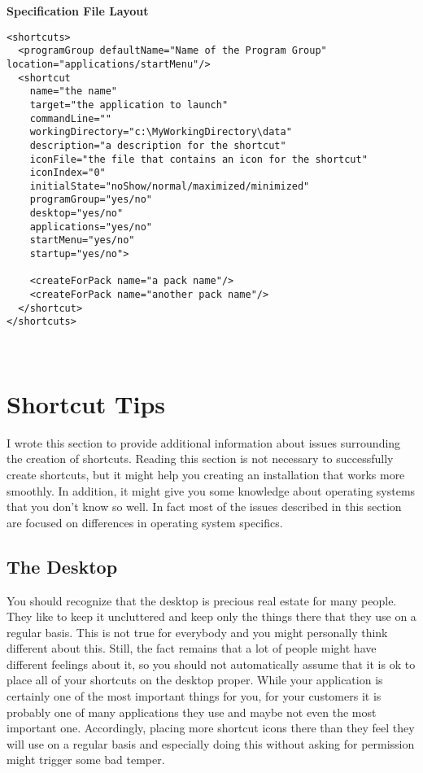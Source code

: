 \textbf{Specification File Layout}
\footnotesize
\begin{verbatim}
<shortcuts>
  <programGroup defaultName="Name of the Program Group" location="applications/startMenu"/>
  <shortcut 
    name="the name"
    target="the application to launch"
    commandLine=""
    workingDirectory="c:\MyWorkingDirectory\data"
    description="a description for the shortcut"
    iconFile="the file that contains an icon for the shortcut" 
    iconIndex="0"
    initialState="noShow/normal/maximized/minimized"
    programGroup="yes/no"
    desktop="yes/no" 
    applications="yes/no" 
    startMenu="yes/no" 
    startup="yes/no">
  
    <createForPack name="a pack name"/>
    <createForPack name="another pack name"/>
  </shortcut>
</shortcuts>
\end{verbatim}\
\normalsize

\section{Shortcut Tips}

I wrote this section to provide additional information about issues
surrounding the creation of shortcuts. Reading this section is not
necessary to successfully create shortcuts, but it might help you
creating an installation that works more smoothly. In addition, it might
give you some knowledge about operating systems that you don't know so
well. In fact most of the issues described in this section are focused
on differences in operating system specifics.\\

\subsection{The Desktop}

You should recognize that the desktop is precious real estate for many
people. They like to keep it uncluttered and keep only the things there
that they use on a regular basis. This is not true for everybody and you
might personally think different about this. Still, the fact remains
that a lot of people might have different feelings about it, so you
should not automatically assume that it is ok to place all of your
shortcuts on the desktop proper. While your application is certainly one
of the most important things for you, for your customers it is probably
one of many applications they use and maybe not even the most important
one. Accordingly, placing more shortcut icons there than they feel they
will use on a regular basis and especially doing this without asking for
permission might trigger some bad temper.\\

